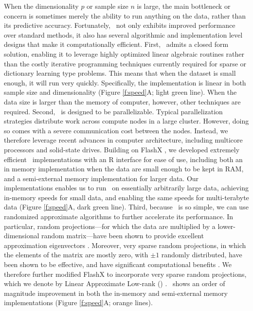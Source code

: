 \documentclass[10pt]{article}
\begin{document}
When the dimensionality $p$ or sample size $n$ is large, the main bottleneck or concern is sometimes merely the ability to run anything on the data, rather than its predictive accuracy. Fortunately, \Lol~not only exhibits improved performance over standard methods, it also has several algorithmic and implementation level designs that make it computationally efficient.
First, \Lol~admits a closed form solution, enabling it to leverage highly optimized linear algebraic routines rather than the costly iterative programming techniques currently required for sparse or dictionary learning type problems.   This means that when the dataset is small enough, it will run very quickly.  
Specifically, the implementation is linear in both sample size and dimensionality (Figure \ref{f:speed}{\color{magenta}A}; light green line).
When the data size is larger than the memory of computer, however, other techniques are required.  
Second, \Lol~is designed to be parallelizable. %
Typical parallelization strategies distribute work across compute nodes in a large cluster.  However, doing so comes with a severe communication cost between the nodes.  Instead, we therefore leverage recent advances in computer architecture, including multicore processors and solid-state drives.  
Building on FlashX \cite{FlashGraph, FlashEigen, FlashMatrix}, we developed  extremely efficient \Lol~implementations with an R interface for ease of use, including both  an in memory implementation when the data are small enough to be kept in RAM, and a semi-external memory implementation for larger data.
Our implementations enables us to run \Lol~on essentially arbitrarily large data,  achieving  in-memory speeds for small data, and enabling the same speeds for multi-terabyte data (Figure \ref{f:speed}{\color{magenta}A}, dark green line).
Third, because \Lol~is so simple, we can use randomized approximate algorithms to further accelerate its performance.  
In particular, random projections---for which the data are multiplied by a lower-dimensional random matrix---have been shown to provide excellent approximation eigenvectors \cite{Candes2006b}.  Moreover, very sparse random projections, in which the elements of the matrix are mostly zero, with $\pm 1$ randomly distributed, have been shown to be effective, and have significant computational benefits \cite{Hastie2006}.
 We therefore further modified FlashX to incorporate very sparse random projections, which we denote by Linear Approximate Low-rank (\Lal) .   \Lal~shows an order of magnitude improvement in both the in-memory and semi-external memory implementations (Figure \ref{f:speed}{\color{magenta}A}; orange lines).
 
\end{document}
